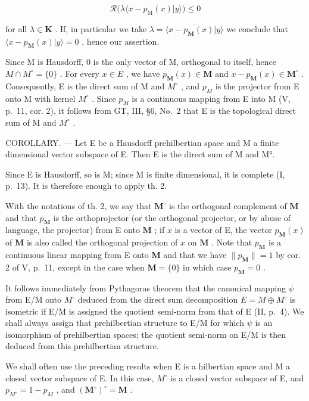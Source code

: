 \[
\mathcal {R} \big (\lambda \langle x - p _ {\mathrm{M}} (x) | y \rangle \big) \leqslant 0
\]

for all \(\lambda \in \mathbf{K}\) . If, in particular we take \(\lambda = \overline{\langle x - p_{\mathbf{M}}(x)|y\rangle}\) we conclude that \(\langle x - p_{\mathbf{M}}(x)|y\rangle = 0\) , hence our assertion.

Since M is Hausdorff, 0 is the only vector of M, orthogonal to itself, hence \(M \cap M^{\circ} = \{0\}\) . For every \(x \in E\) , we have \(p_{\mathbf{M}}(x) \in \mathbf{M}\) and \(x - p_{\mathbf{M}}(x) \in \mathbf{M}^{\circ}\) . Consequently, E is the direct sum of M and \(M^{\circ}\) , and \(p_{M}\) is the projector from E onto M with kernel \(M^{\circ}\) . Since \(p_{M}\) is a continuous mapping from E into M (V, p.~11, cor. 2), it follows from GT, III, §6, No.~2 that E is the topological direct sum of M and \(M^{\circ}\) .

COROLLARY. --- Let E be a Hausdorff prehilbertian space and M a finite dimensional vector subspace of E. Then E is the direct sum of M and M°.

Since E is Hausdorff, so is M; since M is finite dimensional, it is complete (I, p.~13). It is therefore enough to apply th. 2.

With the notations of th. 2, we say that \(\mathbf{M}^{\circ}\) is the orthogonal complement of \(\mathbf{M}\) and that \(p_{\mathbf{M}}\) is the orthoprojector (or the orthogonal projector, or by abuse of language, the projector) from E onto \(\mathbf{M}\) ; if \(x\) is a vector of E, the vector \(p_{\mathbf{M}}(x)\) of \(\mathbf{M}\) is also called the orthogonal projection of \(x\) on \(\mathbf{M}\) . Note that \(p_{\mathbf{M}}\) is a continuous linear mapping from E onto \(\mathbf{M}\) and that we have \(\| p_{\mathbf{M}} \| = 1\) by cor. 2 of V, p.~11, except in the case when \(\mathbf{M} = \{0\}\) in which case \(p_{\mathbf{M}} = 0\) .

It follows immediately from Pythagoras theorem that the canonical mapping \(\psi\) from E/M onto \(M^{\circ}\) deduced from the direct sum decomposition \(E = M \oplus M^{\circ}\) is isometric if E/M is assigned the quotient semi-norm from that of E (II, p.~4). We shall always assign that prehilbertian structure to E/M for which \(\psi\) is an isomorphism of prehilbertian spaces; the quotient semi-norm on E/M is then deduced from this prehilbertian structure.

We shall often use the preceding results when E is a hilbertian space and M a closed vector subspace of E. In this case, \(M^{\circ}\) is a closed vector subspace of E, and \(p_{M^{\circ}} = 1 - p_{M}\) , and \((\mathbf{M}^{\circ})^{\circ} = \mathbf{M}\) .

